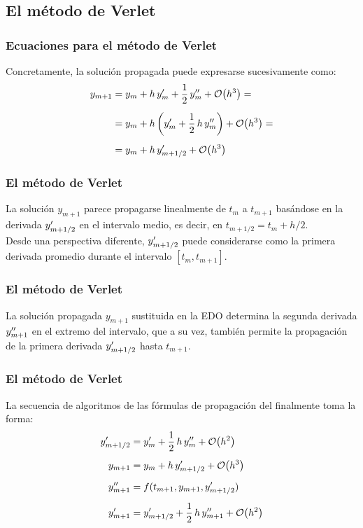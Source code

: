 \subsection{El método de Verlet}
\begin{frame}
\frametitle{Ecuaciones para el método de Verlet}
Concretamente, la solución propagada puede expresarse sucesivamente como:
\begin{align*}
y_{m+1} &= y_{m} + h \, \ptilde{y}_{m} + \dfrac{1}{2} \, \stilde{y}_{m} + \order{h^{3}} = \\[0.5em]
&= y_{m} + h \left(\ptilde{y}_{m} + \dfrac{1}{2} \, h \, \stilde{y}_{m} \right) + \order{h^{3}} = \\[0.5em]
&= y_{m} + h \, \ptilde{y}_{m+1/2} + \order{h^{3}} 
\end{align*}
\end{frame}
\begin{frame}
\frametitle{El método de Verlet}
La solución $y_{m + 1}$ parece propagarse linealmente de $t_{m}$ a $t_{m + 1}$ basándose en la derivada ${y}^{\prime}_{m + 1/2}$ en el intervalo medio, es decir, en $t_{m + 1/2} = t_{m} + h/2$.
\\
\bigskip
Desde una perspectiva diferente, ${y}^{\prime}_{m + 1/2}$ puede considerarse como la primera derivada promedio durante el intervalo $[t_{m}, t_{m + 1}]$.
\end{frame}
\begin{frame}
\frametitle{El método de Verlet}
La solución propagada $y_{m + 1}$ sustituida en la EDO determina la segunda derivada ${y}^{\prime \prime}_{m + 1}$ en el extremo del intervalo, que a su vez, también permite la propagación de la primera derivada ${y}^{\prime}_{m + 1/2}$ hasta $t_{m + 1}$.
\end{frame}
\begin{frame}
\frametitle{El método de Verlet}
La secuencia de algoritmos de las fórmulas de propagación del  finalmente toma la forma:
\begin{align}
\begin{aligned}
\ptilde{y}_{m+1/2} &= \ptilde{y}_{m} + \dfrac{1}{2} \, h \, \stilde{y}_{m} + \order{h^{2}} \\[0.5em]
y_{m+1} &= y_{m} +  h \, \ptilde{y}_{m+1/2} + \order{h^{3}} \\[0.5em]
\stilde{y}_{m+1} &= f(t_{m+1}, y_{m+1}, \ptilde{y}_{m+1/2}) \\[0.5em]
\ptilde{y}_{m+1} &= \ptilde{y}_{m+1/2} + \dfrac{1}{2} \, h \, \stilde{y}_{m+1} + \order{h^{2}}
\end{aligned}
\label{eq:ecucacion_12_59}
\end{align}
\end{frame}
